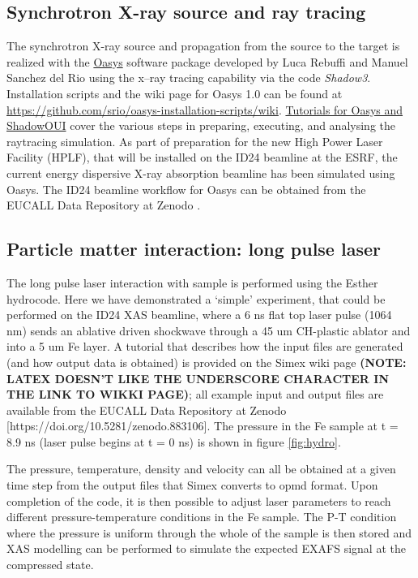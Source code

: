 \subsection{Synchrotron X-ray source and ray tracing}
The synchrotron X-ray source and propagation from the source to the target is
realized with the \href{http://ftp.esrf.eu/pub/scisoft/Oasys/readme.html}{Oasys}
software package developed by Luca Rebuffi and Manuel Sanchez del Rio
 using the x--ray tracing
capability via the code \textit{Shadow3}. Installation scripts and the wiki page for Oasys 1.0 can be
found at
\href{https://github.com/srio/oasys-installation-scripts/wiki}{https://github.com/srio/oasys-installation-scripts/wiki}.
\href{https://github.com/srio/ShadowOui-Tutorial}{Tutorials for
Oasys and ShadowOUI} cover the various steps in preparing, executing, and
analysing the raytracing simulation. As part of preparation for the new High Power
Laser Facility (HPLF), that will be installed on the ID24 beamline at the ESRF,
the current energy dispersive X-ray absorption beamline has been simulated using
Oasys.
The ID24 beamline workflow for Oasys can be obtained from the EUCALL Data
Repository at Zenodo \cite{Briggs2017.zenodo.886451}.

\subsection{Particle matter interaction: long pulse laser}
The long pulse laser interaction with sample is performed using the Esther hydrocode. 
Here we have demonstrated a `simple' experiment, that could be performed on the 
ID24 XAS beamline, where a 6 ns flat top laser pulse (1064 nm) sends an ablative 
driven shockwave through a 45 um CH-plastic ablator and into a 5 um Fe layer. A 
tutorial that describes how the input files are generated (and how output data is 
obtained) is provided on the Simex wiki page \textbf{(NOTE: LATEX DOESN'T LIKE 
THE UNDERSCORE CHARACTER IN THE LINK TO WIKKI PAGE)}; all example input 
and output files are available from the EUCALL Data Repository at Zenodo
 [https://doi.org/10.5281/zenodo.883106]. The pressure in the Fe sample at t = 8.9 ns 
 (laser pulse begins at t = 0 ns) is shown in figure \ref{fig:hydro}. 
 
 The pressure, temperature, density and velocity can all be obtained at a given 
 time step from the output files that Simex converts to opmd format. Upon 
 completion of the code, it is then possible to adjust laser parameters to reach 
 different pressure-temperature conditions in the Fe sample. The P-T condition 
 where the pressure is uniform through the whole of the sample is then stored and 
 XAS modelling can be performed to simulate the expected EXAFS signal at 
 the compressed state.

